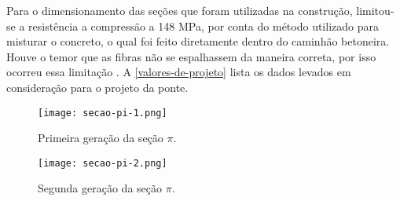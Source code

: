 Para o dimensionamento das seções que foram utilizadas na construção, limitou-se a resistência a compressão a 148 MPa, por conta do método utilizado para misturar o concreto, o qual foi feito diretamente dentro do caminhão betoneira. Houve o temor que as fibras não se espalhassem da maneira correta, por isso ocorreu essa limitação \cite[p.~8]{Rouse}. A \autoref{valores-de-projeto} lista os dados levados em consideração para o projeto da ponte.

\begin{table}[htb]
\end{table}

\begin{figure}[htb]
	\caption{\label{secao-pi-1}Primeira geração da seção $ \pi $.}
	\begin{center}
		\texttt{[image: secao-pi-1.png]}
	\end{center}
\end{figure}

\begin{figure}[htb]
	\caption{\label{secao-pi-2}Segunda geração da seção $ \pi $.}
	\begin{center}
		\texttt{[image: secao-pi-2.png]}
	\end{center}
\end{figure}

